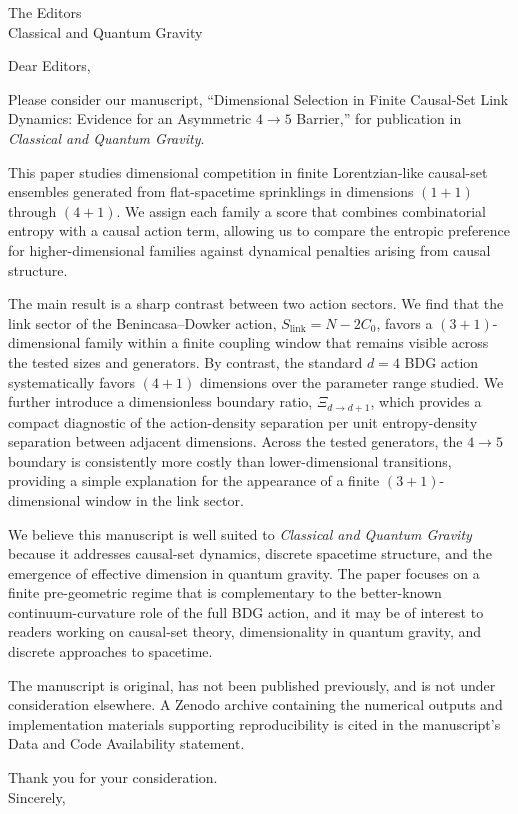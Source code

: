 \documentclass[12pt,a4paper]{letter}
\date{March 2026}
\begin{document}
\begin{letter}{The Editors\\Classical and Quantum Gravity}

\opening{Dear Editors,}

Please consider our manuscript, ``Dimensional Selection in Finite
Causal-Set Link Dynamics: Evidence for an Asymmetric $4{\to}5$
Barrier,'' for publication in \emph{Classical and Quantum Gravity}.

This paper studies dimensional competition in finite Lorentzian-like
causal-set ensembles generated from flat-spacetime sprinklings in
dimensions $(1{+}1)$ through $(4{+}1)$.  We assign each family a score
that combines combinatorial entropy with a causal action term, allowing
us to compare the entropic preference for higher-dimensional families
against dynamical penalties arising from causal structure.

The main result is a sharp contrast between two action sectors.  We find
that the link sector of the Benincasa--Dowker action,
$S_{\mathrm{link}} = N - 2C_0$, favors a $(3{+}1)$-dimensional family
within a finite coupling window that remains visible across the tested
sizes and generators.  By contrast, the standard $d{=}4$ BDG action
systematically favors $(4{+}1)$ dimensions over the parameter range
studied.  We further introduce a dimensionless boundary ratio,
$\Xi_{d\to d+1}$, which provides a compact diagnostic of the
action-density separation per unit entropy-density separation between
adjacent dimensions.  Across the tested generators, the $4{\to}5$
boundary is consistently more costly than lower-dimensional transitions,
providing a simple explanation for the appearance of a finite
$(3{+}1)$-dimensional window in the link sector.

We believe this manuscript is well suited to \emph{Classical and Quantum
Gravity} because it addresses causal-set dynamics, discrete spacetime
structure, and the emergence of effective dimension in quantum gravity.
The paper focuses on a finite pre-geometric regime that is complementary
to the better-known continuum-curvature role of the full BDG action, and
it may be of interest to readers working on causal-set theory,
dimensionality in quantum gravity, and discrete approaches to spacetime.

The manuscript is original, has not been published previously, and is not
under consideration elsewhere.  A Zenodo archive containing the numerical
outputs and implementation materials supporting reproducibility is cited
in the manuscript's Data and Code Availability statement.

\closing{Thank you for your consideration.\\[1em]Sincerely,}

\end{letter}
\end{document}
